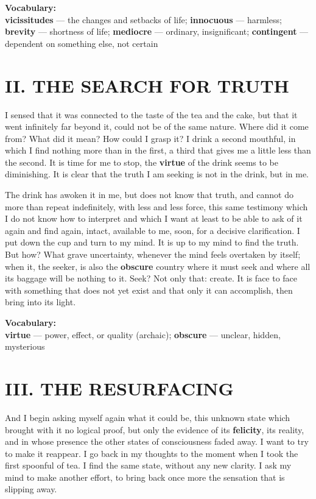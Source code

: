 \documentclass[11pt, a4paper]{article}
\begin{document}
\medskip
\noindent\textbf{Vocabulary:}\\
\textbf{vicissitudes} — the changes and setbacks of life; \textbf{innocuous} — harmless; \textbf{brevity} — shortness of life; \textbf{mediocre} — ordinary, insignificant; \textbf{contingent} — dependent on something else, not certain

\section*{II. THE SEARCH FOR TRUTH}

I sensed that it was connected to the taste of the tea and the cake, but that it went infinitely far beyond it, could not be of the same nature. Where did it come from? What did it mean? How could I grasp it? I drink a second mouthful, in which I find nothing more than in the first, a third that gives me a little less than the second. It is time for me to stop, the \textbf{virtue} of the drink seems to be diminishing. It is clear that the truth I am seeking is not in the drink, but in me. 

The drink has awoken it in me, but does not know that truth, and cannot do more than repeat indefinitely, with less and less force, this same testimony which I do not know how to interpret and which I want at least to be able to ask of it again and find again, intact, available to me, soon, for a decisive clarification. I put down the cup and turn to my mind. It is up to my mind to find the truth. But how? What grave uncertainty, whenever the mind feels overtaken by itself; when it, the seeker, is also the \textbf{obscure} country where it must seek and where all its baggage will be nothing to it. Seek? Not only that: create. It is face to face with something that does not yet exist and that only it can accomplish, then bring into its light.

\medskip
\noindent\textbf{Vocabulary:}\\
\textbf{virtue} — power, effect, or quality (archaic); \textbf{obscure} — unclear, hidden, mysterious

\section*{III. THE RESURFACING}

And I begin asking myself again what it could be, this unknown state which brought with it no logical proof, but only the evidence of its \textbf{felicity}, its reality, and in whose presence the other states of consciousness faded away. I want to try to make it reappear. I go back in my thoughts to the moment when I took the first spoonful of tea. I find the same state, without any new clarity. I ask my mind to make another effort, to bring back once more the sensation that is slipping away. 
\end{document}
